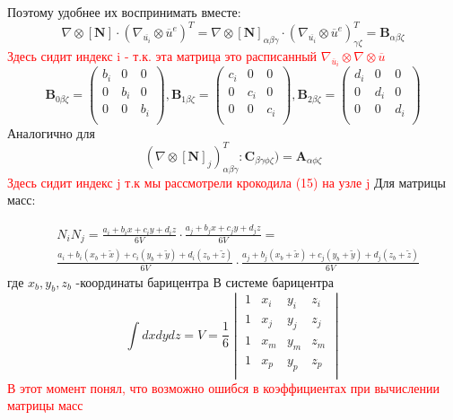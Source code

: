 \documentclass[a4paper,12pt]{article}
\begin{document}
Поэтому удобнее их воспринимать вместе:
\begin{equation}
    \nabla \otimes [\textbf{N}] \cdot (\nabla_{\overline{u_i}} \otimes \overline{u}^e)^T = \nabla \otimes [\textbf{N}]_{\alpha \beta\gamma} \cdot (\nabla_{\overline{u_i}} \otimes \overline{u}^e)^T_{\gamma \zeta} = \textbf{B}_{\alpha \beta \zeta}
\end{equation}
\textcolor{red}{Здесь сидит индекс i - т.к. эта матрица это расписанный $\nabla_{\overline{u}_i} \otimes  \nabla \otimes \overline{u}$}
\begin{equation}
    \textbf{B}_{0\beta \zeta} = 
\begin{pmatrix}
b_i & 0   & 0   \\
0   & b_i & 0   \\
0   & 0   & b_i \\
\end{pmatrix},  \textbf{B}_{1\beta \zeta} = 
\begin{pmatrix}
c_i & 0   & 0   \\
0   & c_i & 0   \\
0   & 0   & c_i \\
\end{pmatrix}, \textbf{B}_{2\beta\zeta} = 
\begin{pmatrix}
d_i & 0   & 0   \\
0   & d_i & 0   \\
0   & 0   & d_i \\
\end{pmatrix}
\end{equation}
Аналогично для 
\begin{equation}
    (\nabla \otimes[\textbf{N}]_j)_{\alpha \beta \gamma}^T:\textbf{C}_{\beta \gamma \phi \zeta}) = \textbf{A}_{\alpha \phi \zeta}
\end{equation}
\textcolor{red}{ Здесь сидит индекс j т.к мы рассмотрели крокодила (15) на узле j}
Для матрицы масс: \par
\begin{align}
    & N_i N_j= \frac{a_i + b_i x + c_i y + d_i z}{6V} \cdot  \frac{a_j + b_j x + c_j y + d_j z}{6V} = \\
    &\frac{a_i + b_i (x_b + \tilde{x}) + c_i (y_b + \tilde{y}) + d_i (z_b + \tilde{z})}{6V} \cdot  \frac{a_j + b_j (x_b + \tilde{x}) + c_j (y_b + \tilde{y}) + d_j (z_b + \tilde{z})}{6V}
\end{align}
где $x_b,y_b,z_b$ -координаты барицентра
В системе барицентра
\begin{equation}
    \int dxdydz = V = \frac{1}{6}     \begin{vmatrix}
1 & x_i & y_i & z_i \\ 
1 & x_j & y_j & z_j \\ 
1 & x_m & y_m & z_m \\ 
1 & x_p & y_p & z_p \\
    \end{vmatrix} 
\end{equation}
\textcolor{red}{В этот момент понял, что возможно ошибся в коэффициентах при вычислении матрицы масс}
\end{document}
